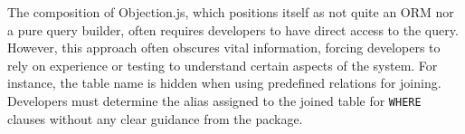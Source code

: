 The composition of Objection.js, which positions itself as not quite an ORM nor
a pure query builder, often requires developers to have direct access to the
query. However, this approach often obscures vital information, forcing
developers to rely on experience or testing to understand certain aspects of the
system. For instance, the table name is hidden when using predefined relations
for joining. Developers must determine the alias assigned to the joined table
for \texttt{WHERE} clauses without any clear guidance from the package.